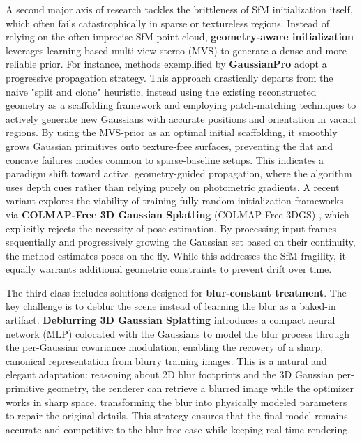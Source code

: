\documentclass[11pt,a4paper]{article}
\begin{document}
A second major axis of research tackles the brittleness of SfM initialization itself, which often fails catastrophically in sparse or textureless regions. Instead of relying on the often imprecise SfM point cloud, \textbf{geometry-aware initialization} leverages learning-based multi-view stereo (MVS) to generate a dense and more reliable prior. For instance, methods exemplified by \textbf{GaussianPro} \cite{arxiv:2402.14650v1} adopt a progressive propagation strategy. This approach drastically departs from the naive "split and clone" heuristic, instead using the existing reconstructed geometry as a scaffolding framework and employing patch-matching techniques to actively generate new Gaussians with accurate positions and orientation in vacant regions. By using the MVS-prior as an optimal initial scaffolding, it smoothly grows Gaussian primitives onto texture-free surfaces, preventing the flat and concave failures modes common to sparse-baseline setups. This indicates a paradigm shift toward active, geometry-guided propagation, where the algorithm uses depth cues rather than relying purely on photometric gradients. A recent variant explores the viability of training fully random initialization frameworks via \textbf{COLMAP-Free 3D Gaussian Splatting} (COLMAP-Free 3DGS) \cite{arxiv:2312.07504v1}, which explicitly rejects the necessity of pose estimation. By processing input frames sequentially and progressively growing the Gaussian set based on their continuity, the method estimates poses on-the-fly. While this addresses the SfM fragility, it equally warrants additional geometric constraints to prevent drift over time.

The third class includes solutions designed for \textbf{blur-constant treatment}. The key challenge is to deblur the scene instead of learning the blur as a baked-in artifact. \textbf{Deblurring 3D Gaussian Splatting} \cite{arxiv:2401.00834v1} introduces a compact neural network (MLP) colocated with the Gaussians to model the blur process through the per-Gaussian covariance modulation, enabling the recovery of a sharp, canonical representation from blurry training images. This is a natural and elegant adaptation: reasoning about 2D blur footprints and the 3D Gaussian per-primitive geometry, the renderer can retrieve a blurred image while the optimizer works in sharp space, transforming the blur into physically modeled parameters to repair the original details. This strategy ensures that the final model remains accurate and competitive to the blur-free case while keeping real-time rendering.
\end{document}
